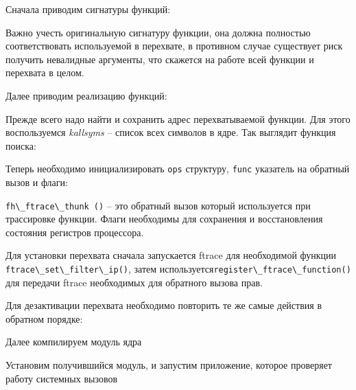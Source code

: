\par Сначала приводим сигнатуры функций:


\par Важно учесть оригинальную сигнатуру функции, она должна полностью соответствовать используемой в перехвате, в противном случае существует риск получить невалидные аргументы, что скажется на работе всей функции и перехвата в целом.

\par Далее приводим реализацию функций:



\par Прежде всего надо найти и сохранить адрес перехватываемой функции. Для этого воспользуемся \textit{kallsyms} -- список всех символов в ядре. Так выглядит функция поиска:



\par Теперь необходимо инициализировать \lstinline|ops| структуру, \lstinline|func| указатель на обратный вызов и флаги: 



\lstinline|fh\_ftrace\_thunk ()| -- это обратный вызов который используется при трассировке функции. Флаги необходимы для сохранения и восстановления состояния регистров процессора. 

\par Для установки перехвата сначала запускается ftrace для необходимой функции \lstinline|ftrace\_set\_filter\_ip()|, затем используется\lstinline|register\_ftrace\_function()| для передачи ftrace необходимых для обратного вызова прав.

\par Для дезактивации перехвата необходимо повторить те же самые действия в обратном порядке:



\clearpage

\par Далее компилируем модуль ядра


\par Установим получившийся модуль, и запустим приложение, которое проверяет работу системных вызовов

